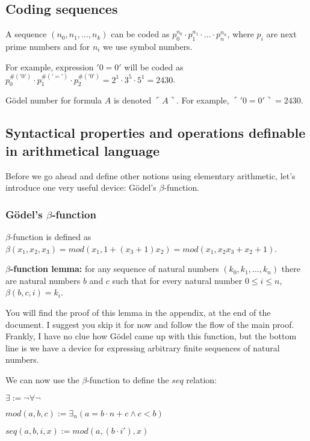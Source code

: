 \documentclass{article}
\begin{document}
\subsection{Coding sequences}

A sequence $(n_0, n_1, ..., n_k)$ can be coded as $p_0^{n_0} \cdot p_1^{n_1} \cdot ... \cdot p_n^{n_n}$,
where $p_i$ are next prime numbers and for $n_i$ we use symbol numbers.

For example, expression $'0=0'$ will be coded as
$p_0^{\#('0')} \cdot p_1^{\#('=')} \cdot p_2^{\#('0')} = 2^1 \cdot 3^5 \cdot 5^1 = 2430$.

Gödel number for formula $A$ is denoted $\ulcorner A \urcorner$.
For example, $\ulcorner '0=0' \urcorner = 2430$.

\subsection{Syntactical properties and operations definable in arithmetical language}

Before we go ahead and define other notions using elementary arithmetic, let's introduce
one very useful device: Gödel's $\beta$-function.

\subsubsection{Gödel's $\beta$-function}

$\beta$-function is defined as $\beta(x_1, x_2, x_3) = mod(x_1, 1+(x_3+1)x_2) = 
mod(x_1, x_2x_3+x_2+1)$.

\textbf{$\beta$-function lemma:} for any sequence of natural numbers $(k_0, k_1, ..., k_n)$
there are natural numbers $b$ and $c$ such that for every natural number $0 \leqslant i \leqslant n$,
$\beta(b, c, i) = k_i$.

You will find the proof of this lemma in the appendix, at the end of the document. I suggest you skip it
for now and follow the flow of the main proof. Frankly, I have no clue how Gödel came up with this
function, but the bottom line is we have a device for expressing arbitrary finite sequences of natural
numbers.

We can now use the $\beta$-function to define the $seq$ relation:

\begin{center}
    $\exists := \neg \forall \neg$

    $mod(a, b, c) := \exists_n (a = b \cdot n + c \land c < b)$
    
    $seq(a, b, i, x) := mod(a, (b \cdot i'), x)$
\end{center}
\end{document}
